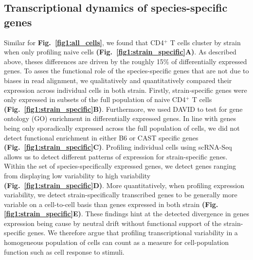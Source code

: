 \subsection{Transcriptional dynamics of species-specific genes}

Similar for \textbf{Fig.~\ref{fig1:all_cells}}, we found that CD4$^+$ T cells cluster by strain when only profiling naive cells \textbf{(Fig.~\ref{fig1:strain_specific}A)}. As described above, theses differences are driven by the roughly 15\% of differentially expressed genes. To asses the functional role of the species-specific genes that are not due to biases in read alignment, we qualitatively and quantitatively compared their expression across individual cells in both strain. Firstly, strain-specific genes were only expressed in subsets of the full population of naive CD4$^+$ T cells \textbf{(Fig.~\ref{fig1:strain_specific}B)}. Furthermore, we used DAVID \citep{Dennis2003} to test for gene ontology (GO) enrichment in differentially expressed genes. In line with genes being only sporadically expressed across the full population of cells, we did not detect functional enrichment in either B6 or CAST specific genes \textbf{(Fig.~\ref{fig1:strain_specific}C)}. Profiling individual cells using scRNA-Seq allows us to detect different patterns of expression for strain-specific genes. Within the set of species-specifically expressed genes, we detect genes ranging from displaying low variability to high variability \textbf{(Fig.~\ref{fig1:strain_specific}D)}. More quantitatively, when profiling expression variability, we detect strain-specifically transcribed genes to be generally more variable on a cell-to-cell basis than genes expressed in both strain \textbf{(Fig. \ref{fig1:strain_specific}E)}. These findings hint at the detected divergence in genes expression being cause by neutral drift without functional support of the strain-specific genes. We therefore argue that profiling transcriptional variability in a homogeneous population of cells can count as a measure for cell-population function such as cell response to stimuli.

\newpage

